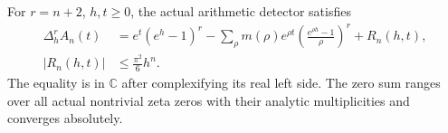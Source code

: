 \begin{theorem}
\label{kernel:actual-smoothed-explicit}
\leanok
For $r=n+2$, $h,t\geq0$, the actual arithmetic detector satisfies
\[
 \begin{aligned}
 \Delta_h^r A_n(t)&=e^t(e^h-1)^r
 -\sum_{\rho}m(\rho)e^{\rho t}
       \left(\frac{e^{\rho h}-1}{\rho}\right)^r+R_n(h,t),\\
 |R_n(h,t)|&\leq\frac{\pi^2}{6}h^n.
 \end{aligned}
\]
The equality is in $\mathbb C$ after complexifying its real left
side.  The zero sum ranges over all actual nontrivial zeta zeros with
their analytic multiplicities and converges absolutely.
\end{theorem}
